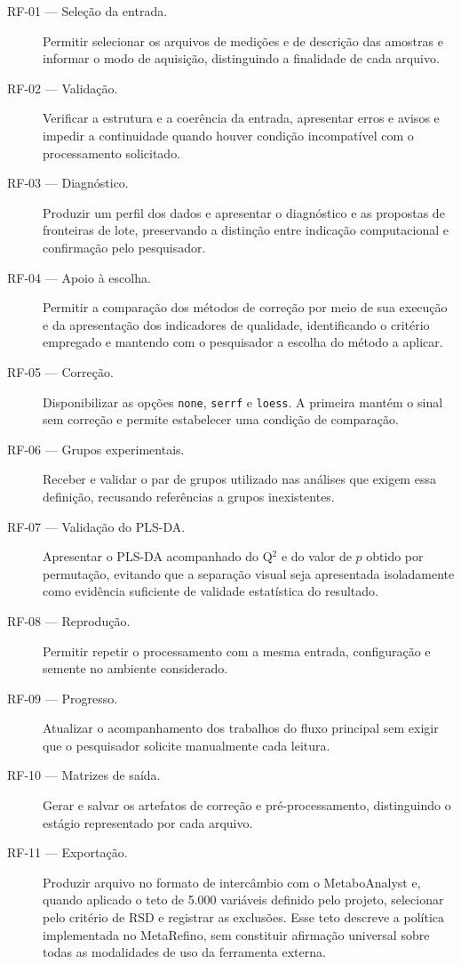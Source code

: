 \begin{description}
\item[RF-01 --- Seleção da entrada.] Permitir selecionar os arquivos de medições e de descrição das amostras e informar o modo de aquisição, distinguindo a finalidade de cada arquivo.
\item[RF-02 --- Validação.] Verificar a estrutura e a coerência da entrada, apresentar erros e avisos e impedir a continuidade quando houver condição incompatível com o processamento solicitado.
\item[RF-03 --- Diagnóstico.] Produzir um perfil dos dados e apresentar o diagnóstico e as propostas de fronteiras de lote, preservando a distinção entre indicação computacional e confirmação pelo pesquisador.
\item[RF-04 --- Apoio à escolha.] Permitir a comparação dos métodos de correção por meio de sua execução e da apresentação dos indicadores de qualidade, identificando o critério empregado e mantendo com o pesquisador a escolha do método a aplicar.
\item[RF-05 --- Correção.] Disponibilizar as opções \texttt{none}, \texttt{serrf} e \texttt{loess}. A primeira mantém o sinal sem correção e permite estabelecer uma condição de comparação.
\item[RF-06 --- Grupos experimentais.] Receber e validar o par de grupos utilizado nas análises que exigem essa definição, recusando referências a grupos inexistentes.
\item[RF-07 --- Validação do PLS-DA.] Apresentar o PLS-DA acompanhado do Q$^{2}$ e do valor de $p$ obtido por permutação, evitando que a separação visual seja apresentada isoladamente como evidência suficiente de validade estatística do resultado.
\item[RF-08 --- Reprodução.] Permitir repetir o processamento com a mesma entrada, configuração e semente no ambiente considerado.
\item[RF-09 --- Progresso.] Atualizar o acompanhamento dos trabalhos do fluxo principal sem exigir que o pesquisador solicite manualmente cada leitura.
\item[RF-10 --- Matrizes de saída.] Gerar e salvar os artefatos de correção e pré-processamento, distinguindo o estágio representado por cada arquivo.
\item[RF-11 --- Exportação.] Produzir arquivo no formato de intercâmbio com o MetaboAnalyst e, quando aplicado o teto de 5.000 variáveis definido pelo projeto, selecionar pelo critério de RSD e registrar as exclusões. Esse teto descreve a política implementada no MetaRefino, sem constituir afirmação universal sobre todas as modalidades de uso da ferramenta externa.

\end{description}

